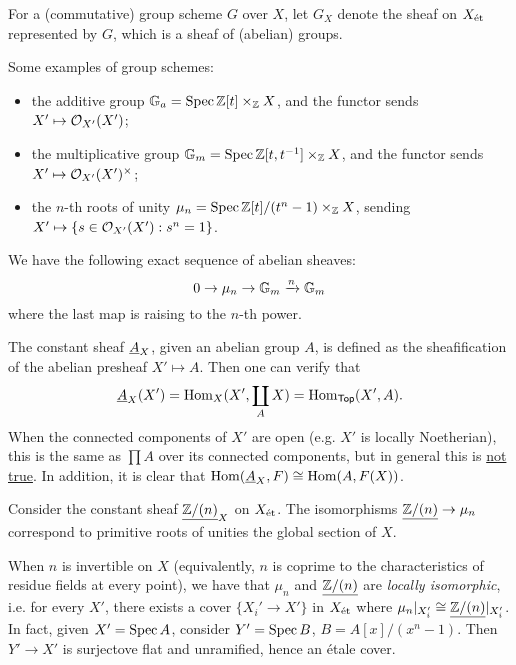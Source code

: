 \documentclass[11pt]{amsart}
\begin{document}
For a (commutative) group scheme $G$ over $X$, let $G_X$ denote the sheaf on $X_{\operatorname{\acute{e}t}}$ represented by $G$, which is a sheaf of (abelian) groups.

\begin{exm}
    Some examples of group schemes:
    \begin{itemize}
        \item the additive group $\mathbb{G}_a = \operatorname{Spec} \mathbb{Z}[t]\times_{\mathbb{Z}} X$, and the functor sends $X'\mapsto \mathcal{O}_{X'}(X')$;
        \item the multiplicative group $\mathbb{G}_m = \operatorname{Spec} \mathbb{Z}[t,t^{-1}]\times_{\mathbb{Z}} X$, and the functor sends $X'\mapsto \mathcal{O}_{X'}(X')^{\times}$;
        \item the $n$-th roots of unity $\mu_n = \operatorname{Spec} \mathbb{Z}[t]/(t^n-1) \times_{\mathbb{Z}} X$, sending $X'\mapsto \{s\in \mathcal{O}_{X'}(X'): s^n = 1\}$.
    \end{itemize}
\end{exm}

We have the following exact sequence of abelian sheaves:
\[0\to \mu_n \to \mathbb{G}_m \xrightarrow{n} \mathbb{G}_m\]
where the last map is raising to the $n$-th power.

\begin{exm}
    The constant sheaf $\underline{A}_X$, given an abelian group $A$, is defined as the sheafification of the abelian presheaf $X'\mapsto A$. Then one can verify that
    \[\underline{A}_X(X') = \operatorname{Hom}_X(X', \coprod_A X) = \operatorname{Hom}_{\mathsf{Top}}(X', A).\]
    When the connected components of $X'$ are open (e.g. $X'$ is locally Noetherian), this is the same as $\prod A$ over its connected components, but in general this is \href{https://math.stackexchange.com/questions/3178359/constant-sheaves-on-the-%C3%A9tale-site-of-a-scheme}{not true}. In addition, it is clear that $\operatorname{Hom}(\underline{A}_X, F) \cong \operatorname{Hom}(A, F(X))$.

    Consider the constant sheaf $\underline{\mathbb{Z}/(n)}_X$ on $X_{\operatorname{\acute{e}t}}$. The isomorphisms $\underline{\mathbb{Z}/(n)}\to \mu_n$ correspond to primitive roots of unities the global section of $X$. 
    
    When $n$ is invertible on $X$ (equivalently, $n$ is coprime to the characteristics of residue fields at every point), we have that $\mu_n$ and $\underline{\mathbb{Z}/(n)}$ are \emph{locally isomorphic}, i.e. for every $X'$, there exists a cover $\{X_i'\to X'\}$ in $X_{\operatorname{\acute{e}t}}$ where $\mu_n|_{X_i'} \cong \underline{\mathbb{Z}/(n)}|_{X_i'}$. In fact, given $X' = \operatorname{Spec} A$, consider $Y' = \operatorname{Spec} B$, $B = A[x]/(x^n - 1)$. Then $Y'\to X'$ is surjectove flat and unramified, hence an \'etale cover.
\end{exm}
\end{document}
